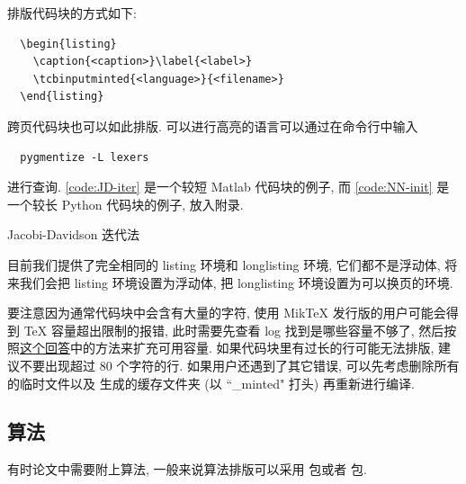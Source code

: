 排版代码块的方式如下:
\begin{verbatim}
  \begin{listing}
    \caption{<caption>}\label{<label>}
    \tcbinputminted{<language>}{<filename>}
  \end{listing}
\end{verbatim}
跨页代码块也可以如此排版. 可以进行高亮的语言可以通过在命令行中输入
\begin{verbatim}
  pygmentize -L lexers
\end{verbatim}
进行查询. \ref{code:JD-iter} 是一个较短 Matlab 代码块的例子, 而 \ref{code:NN-init} 是一个较长 Python 代码块的例子, 放入附录.

\begin{listing}
  \caption{Jacobi-Davidson 迭代法}\label{code:JD-iter}
\end{listing}

目前我们提供了完全相同的 listing 环境和 longlisting 环境, 它们都不是浮动体, 将来我们会把 listing 环境设置为浮动体, 把 longlisting 环境设置为可以换页的环境.

要注意因为通常代码块中会含有大量的字符, 使用 MikTeX 发行版的用户可能会得到 TeX 容量超出限制的报错, 此时需要先查看 log 找到是哪些容量不够了, 然后按照\href{https://tex.stackexchange.com/a/548335/}{这个回答}中的方法来扩充可用容量. 如果代码块里有过长的行可能无法排版, 建议不要出现超过 80 个字符的行. 如果用户还遇到了其它错误, 可以先考虑删除所有的临时文件以及  生成的缓存文件夹 (以 ``\_minted" 打头) 再重新进行编译.

\zhlipsum[1]

\subsection{算法}

有时论文中需要附上算法, 一般来说算法排版可以采用  包或者  包.


